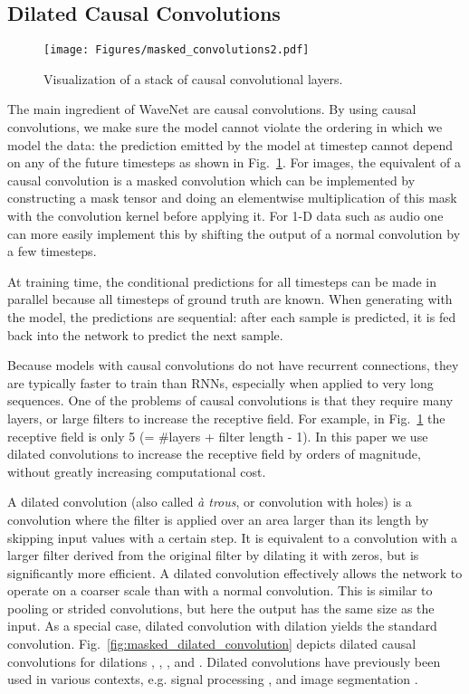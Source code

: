 \documentclass{article}
\makeatletter
\newcommand{\figref}[1]{Fig.~\ref{#1}}
\newcommand*{\eg}{e.g.\@\xspace}
\makeatother
\begin{document}
\subsection{Dilated Causal Convolutions}

\begin{figure}[h]
\centering
\texttt{[image: Figures/masked\_convolutions2.pdf]}
\caption{Visualization of a stack of causal convolutional layers.}
\label{fig:masked_convolution}
\end{figure}

The main ingredient of WaveNet are causal convolutions. By using causal convolutions, we make sure the model cannot violate the ordering in which we model the data: the prediction  emitted by the model at timestep  cannot depend on any of the future timesteps  as shown in \figref{fig:masked_convolution}. For images, the equivalent of a causal convolution is a masked convolution \citep{van2016pixel} which can be implemented by constructing a mask tensor and doing an elementwise multiplication of this mask with the convolution kernel before applying it. For 1-D data such as audio one can more easily implement this by shifting the output of a normal convolution by a few timesteps. 

At training time, the conditional predictions for all timesteps can be made in parallel because all timesteps of ground truth  are known. When generating with the model, the predictions are sequential: after each sample is predicted, it is fed back into the network to predict the next sample.

Because models with causal convolutions do not have recurrent connections, they are typically faster to train than RNNs, especially when applied to very long sequences. One of the problems of causal convolutions is that they require many layers, or large filters to increase the receptive field. For example, in \figref{fig:masked_convolution} the receptive field is only 5 (= \#layers + filter length - 1). In this paper we use dilated convolutions to increase the receptive field by orders of magnitude, without greatly increasing computational cost. 

A dilated convolution (also called \emph{\`a trous}, or convolution with holes) is a convolution where the filter is applied over an area larger than its length by skipping input values with a certain step. It is equivalent to a convolution with a larger filter derived from the original filter by dilating it with zeros, but is significantly more efficient. A dilated convolution effectively allows the network to operate on a coarser scale than with a normal convolution. This is similar to pooling or strided convolutions, but here the output has the same size as the input. As a special case, dilated convolution with dilation  yields the standard convolution.  \figref{fig:masked_dilated_convolution} depicts dilated causal convolutions for dilations , , , and . Dilated convolutions have previously been used in various contexts, \eg signal processing \citep{Holschneider1989,Dutilleux1989}, and image segmentation \citep{chen14semantic,YuKoltun2016}.
\end{document}

